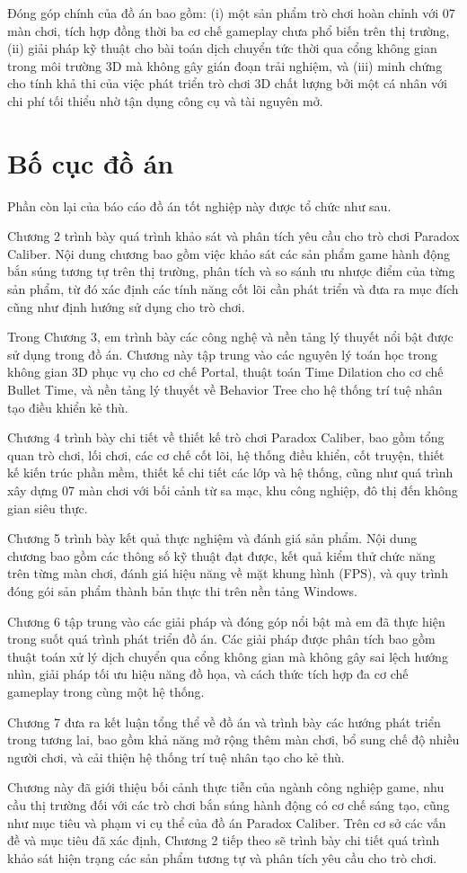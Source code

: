 \documentclass[../DoAn.tex]{subfiles}
\begin{document}
Đóng góp chính của đồ án bao gồm: (i) một sản phẩm trò chơi hoàn chỉnh với 07 màn chơi, tích hợp đồng thời ba cơ chế gameplay chưa phổ biến trên thị trường, (ii) giải pháp kỹ thuật cho bài toán dịch chuyển tức thời qua cổng không gian trong môi trường 3D mà không gây gián đoạn trải nghiệm, và (iii) minh chứng cho tính khả thi của việc phát triển trò chơi 3D chất lượng bởi một cá nhân với chi phí tối thiểu nhờ tận dụng công cụ và tài nguyên mở.

\section{Bố cục đồ án}
\label{section:1.5}

Phần còn lại của báo cáo đồ án tốt nghiệp này được tổ chức như sau.

Chương 2 trình bày quá trình khảo sát và phân tích yêu cầu cho trò chơi Paradox Caliber. Nội dung chương bao gồm việc khảo sát các sản phẩm game hành động bắn súng tương tự trên thị trường, phân tích và so sánh ưu nhược điểm của từng sản phẩm, từ đó xác định các tính năng cốt lõi cần phát triển và đưa ra mục đích cũng như định hướng sử dụng cho trò chơi.

Trong Chương 3, em trình bày các công nghệ và nền tảng lý thuyết nổi bật được sử dụng trong đồ án. Chương này tập trung vào các nguyên lý toán học trong không gian 3D phục vụ cho cơ chế Portal, thuật toán Time Dilation cho cơ chế Bullet Time, và nền tảng lý thuyết về Behavior Tree cho hệ thống trí tuệ nhân tạo điều khiển kẻ thù.

Chương 4 trình bày chi tiết về thiết kế trò chơi Paradox Caliber, bao gồm tổng quan trò chơi, lối chơi, các cơ chế cốt lõi, hệ thống điều khiển, cốt truyện, thiết kế kiến trúc phần mềm, thiết kế chi tiết các lớp và hệ thống, cũng như quá trình xây dựng 07 màn chơi với bối cảnh từ sa mạc, khu công nghiệp, đô thị đến không gian siêu thực.

Chương 5 trình bày kết quả thực nghiệm và đánh giá sản phẩm. Nội dung chương bao gồm các thông số kỹ thuật đạt được, kết quả kiểm thử chức năng trên từng màn chơi, đánh giá hiệu năng về mặt khung hình (FPS), và quy trình đóng gói sản phẩm thành bản thực thi trên nền tảng Windows.

Chương 6 tập trung vào các giải pháp và đóng góp nổi bật mà em đã thực hiện trong suốt quá trình phát triển đồ án. Các giải pháp được phân tích bao gồm thuật toán xử lý dịch chuyển qua cổng không gian mà không gây sai lệch hướng nhìn, giải pháp tối ưu hiệu năng đồ họa, và cách thức tích hợp đa cơ chế gameplay trong cùng một hệ thống.

Chương 7 đưa ra kết luận tổng thể về đồ án và trình bày các hướng phát triển trong tương lai, bao gồm khả năng mở rộng thêm màn chơi, bổ sung chế độ nhiều người chơi, và cải thiện hệ thống trí tuệ nhân tạo cho kẻ thù.

Chương này đã giới thiệu bối cảnh thực tiễn của ngành công nghiệp game, nhu cầu thị trường đối với các trò chơi bắn súng hành động có cơ chế sáng tạo, cũng như mục tiêu và phạm vi cụ thể của đồ án Paradox Caliber. Trên cơ sở các vấn đề và mục tiêu đã xác định, Chương 2 tiếp theo sẽ trình bày chi tiết quá trình khảo sát hiện trạng các sản phẩm tương tự và phân tích yêu cầu cho trò chơi.
\end{document}
